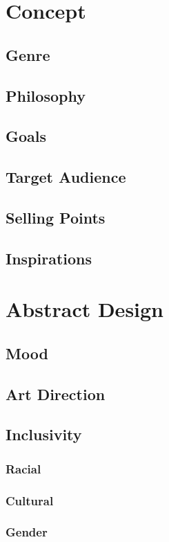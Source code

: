 



\section{Concept}
\subsection{Genre}
\subsection{Philosophy}
\subsection{Goals}
\subsection{Target Audience}
\subsection{Selling Points}
\subsection{Inspirations}

\section{Abstract Design}
\subsection{Mood}
\subsection{Art Direction}
\subsection{Inclusivity}
\subsubsection{Racial}
\subsubsection{Cultural}
\subsubsection{Gender}
